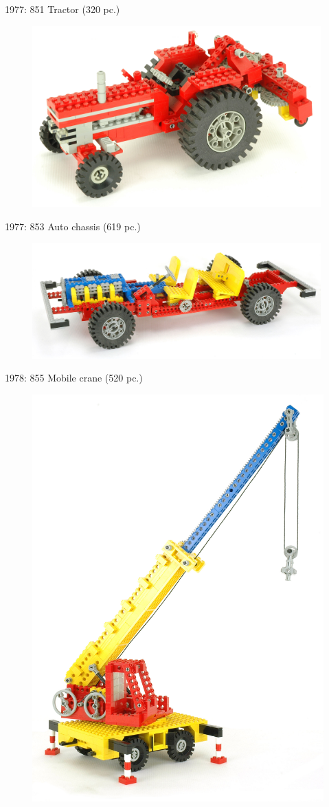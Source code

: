 \documentclass[xcolor=dvipsnames]{beamer}
\begin{document}
\begin{frame}[fragile]{1977: 851 Tractor (320 pc.)}
\begin{figure}[H]
 \centering
 \includegraphics[width=0.99\textwidth]{1977_851_tractor}
\end{figure}
\end{frame}

\begin{frame}[fragile]{1977: 853 Auto chassis (619 pc.)}
\begin{figure}[H]
 \centering
 \includegraphics[width=0.99\textwidth]{1977_853_car}
\end{figure}
\end{frame}

\begin{frame}[fragile]{1978: 855 Mobile crane (520 pc.)}
\begin{figure}[H]
 \centering
 \includegraphics[height=0.7\textwidth]{1978_855_crane}
\end{figure}
\end{frame}
\end{document}
